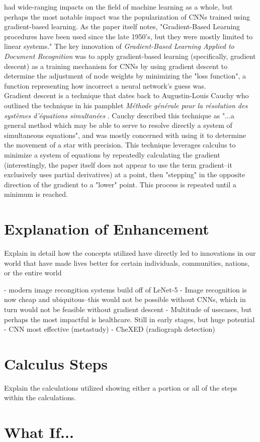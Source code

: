 \documentclass[11pt, a4paper]{article}
\begin{document}
\cite{lecun} had wide-ranging impacts on the field of machine learning as a whole, but perhaps the most 
notable impact was the popularization of CNNs trained using gradient-based learning. As the paper itself notes, 
"Gradient-Based Learning procedures have been used since the late 1950's, but they were mostly limited to 
linear systems." \cite{lecun} The key innovation of \textit{Gradient-Based Learning Applied to Document Recognition} was to apply gradient-based 
learning (specifically, gradient descent) as a training mechanism for CNNs by using gradient descent to determine
the adjustment of node weights by minimizing the "loss function", a function representing how incorrect a neural 
network's guess was.\\

Gradient descent is a technique that dates back to Augustin-Louis Cauchy who outlined the technique in his pamphlet 
\textit{M\'ethode g\'en\'erale pour la r\'esolution des syst\`emes d'\'equations simultan\'ees} \cite{cauchy}. Cauchy described this technique as "...a general 
method which may be able to serve to resolve directly a system of simultaneous equations", and was mostly concerned
with using it to determine the movement of a star with precision. This technique leverages calculus to minimize a system of equations by repeatedly
calculating the gradient (interestingly, the paper itself does not appear to use the term gradient--it exclusively
uses partial derivatives) at a point, then "stepping" in the opposite direction of the gradient to a "lower" point. This 
process is repeated until a minimum is reached. 

\section{Explanation of Enhancement}
Explain in detail how the concepts utilized have directly led to innovations in our world that have made lives better for certain individuals, communities, nations, or the entire world

- modern image recongition systems build off of LeNet-5
    - Image recognition is now cheap and ubiquitous--this would not be possible without CNNs, which in turn would not be feasible without gradient descent
- Multitude of usecases, but perhaps the most impactful is healthcare. Still in early stages, but huge potential
    - CNN most effective (metastudy)
    - CheXED (radiograph detection)

\section{Calculus Steps}
Explain the calculations utilized showing either a portion or all of the steps within the calculations.

\section{What If...}


\newpage


\end{document}
